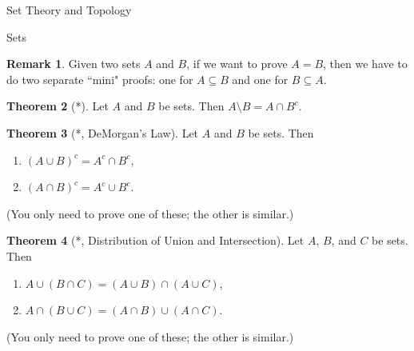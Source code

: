 \documentclass[11pt]{article}
\theoremstyle{definition}
\newtheorem{theorem}{Theorem}[section]
\newtheorem{remark}[theorem]{Remark}
\begin{document}
\begin{section}{Set Theory and Topology}
\begin{subsection}{Sets}
\begin{remark}
Given two sets $A$ and $B$, if we want to prove $A=B$, then we have to do two separate ``mini" proofs: one for $A\subseteq B$ and one for $B\subseteq A$.
\end{remark}

\begin{theorem}[*]
Let $A$ and $B$ be sets.  Then $A\setminus B = A \cap B^c$.
\end{theorem}

\begin{theorem}[*, DeMorgan's Law]
Let $A$ and $B$ be sets. Then 
\begin{enumerate}
\item $(A \cup B)^c = A^c \cap B^c$,
\item $(A \cap B)^c = A^c \cup B^c$.
\end{enumerate}
(You only need to prove one of these; the other is similar.)
\end{theorem}

\begin{theorem}[*, Distribution of Union and Intersection]
Let $A$, $B$, and $C$ be sets. Then
\begin{enumerate}
\item $A \cup(B\cap C) = (A\cup B)\cap (A\cup C)$,
\item $A\cap (B\cup C)= (A\cap B)\cup (A\cap C)$.
\end{enumerate}
(You only need to prove one of these; the other is similar.)
\end{theorem}

\end{subsection}

\end{section}
\end{document}
